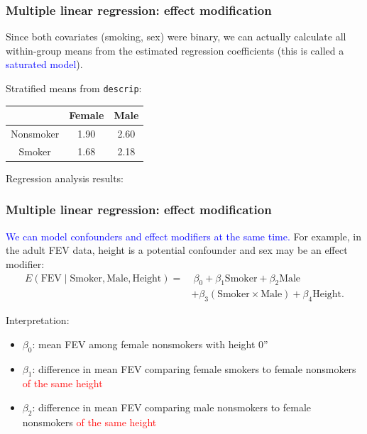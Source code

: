 \documentclass[12pt, 
hyperref={colorlinks=true, linkcolor=blue, urlcolor=cyan}]{beamer}
\begin{document}
\begin{frame}
\frametitle{Multiple linear regression: effect modification}

Since both covariates (smoking, sex) were binary, we can actually calculate all within-group means from the estimated regression coefficients (this is called a \textcolor{blue}{saturated model}).

Stratified means from \texttt{descrip}: {\small \begin{tabular}{|c|c|c|}
\hline
 & Female & Male \\
 \hline
Nonsmoker & 1.90 & 2.60 \\
\hline
Smoker & 1.68 & 2.18  \\
\hline
\end{tabular}
}

Regression analysis results: 
\end{frame}

\begin{frame}
\frametitle{Multiple linear regression: effect modification}

\textcolor{blue}{We can model confounders and effect modifiers at the same time.} For example, in the adult FEV data, height is a potential confounder and sex may be an effect modifier:
\begin{align*}
E(\text{FEV} \mid \text{Smoker}, \text{Male}, \text{Height}) = & \ \beta_0 + \beta_1 \text{Smoker} + \beta_2 \text{Male}\\
& + \beta_3 (\text{Smoker} \times \text{Male}) + \beta_4 \text{Height}.
\end{align*}

Interpretation: 
\begin{itemize}
\item $\beta_0$: mean FEV among female nonsmokers with height 0''
\item $\beta_1$: difference in mean FEV comparing female smokers to female nonsmokers \textcolor{red}{of the same height}
\item $\beta_2$: difference in mean FEV comparing male nonsmokers to female nonsmokers \textcolor{red}{of the same height}
\end{itemize}
\end{frame}
\end{document}
